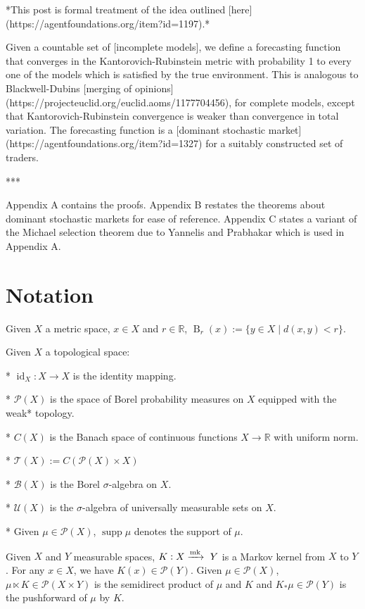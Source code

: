 \documentclass[a4paper]{article}
\DeclareMathOperator{\Supp}{supp}
\newcommand{\Reals}{\mathbb{R}}
\newcommand{\Markov}{\xrightarrow{\textnormal{mk}}}
\newcommand{\Prob}{\mathcal{P}}
\newcommand{\T}{\mathcal{T}}
\newcommand{\UM}{\mathcal{U}}
\newcommand{\I}{\operatorname{id}}
\newcommand{\Ball}{\operatorname{B}}
\begin{document}
*This post is formal treatment of the idea outlined [here](https://agentfoundations.org/item?id=1197).*

Given a countable set of [incomplete models], we define a forecasting function that converges in the Kantorovich-Rubinstein metric with probability 1 to every one of the models which is satisfied by the true environment. This is analogous to Blackwell-Dubins [merging of opinions](https://projecteuclid.org/euclid.aoms/1177704456), for complete models, except that Kantorovich-Rubinstein convergence is weaker than convergence in total variation. The forecasting function is a [dominant stochastic market](https://agentfoundations.org/item?id=1327) for a suitably constructed set of traders.

***

Appendix A contains the proofs. Appendix B restates the theorems about dominant stochastic markets for ease of reference. Appendix C states a variant of the Michael selection theorem due to Yannelis and Prabhakar which is used in Appendix A.

\section{Notation}

Given ${X}$ a metric space, ${x \in X}$ and $r \in \Reals$, ${\Ball_r(x):=\{y \in X \mid d(x,y) < r\}}$.

Given ${X}$ a topological space:

* ${\I_X: X \rightarrow X}$ is the identity mapping.

* ${\Prob(X)}$ is the space of Borel probability measures on ${X}$ equipped with the weak* topology.

* ${C(X)}$ is the Banach space of continuous functions ${X \rightarrow \Reals}$ with uniform norm.

* $\T(X):= C(\Prob(X) \times X)$

* ${\mathcal{B}}(X)$ is the Borel ${\sigma}$-algebra on ${X}$.

* ${\UM(X)}$ is the ${\sigma}$-algebra of universally measurable sets on ${X}$.

* Given ${\mu \in \Prob(X)}$, ${\Supp \mu}$ denotes the support of ${\mu}$. 

Given ${X}$ and ${Y}$ measurable spaces, ${K: X \Markov\ Y}$ is a Markov kernel from ${X}$ to ${Y}$. For any ${x \in X}$, we have ${K(x) \in \Prob(Y)}$. Given ${\mu \in \Prob(X)}$, ${\mu \ltimes K \in \Prob(X \times Y)}$ is the semidirect product of ${\mu}$ and ${K}$ and ${K_*\mu \in \Prob(Y)}$ is the pushforward of ${\mu}$ by ${K}$.
\end{document}
